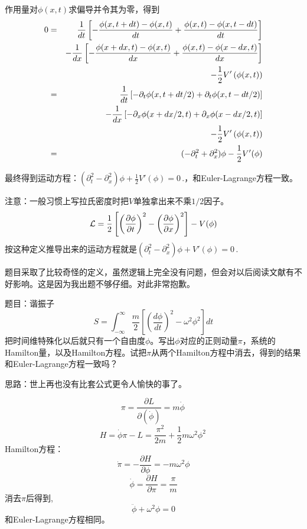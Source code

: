 \documentclass[CJK]{beamer}
\begin{document}
\begin{frame}
\bch
作用量对$\phi(x, t)$求偏导并令其为零，得到
\begin{eqnarray}
0 &=& \frac{1}{dt} \left [ -\frac{\phi(x, t+dt) - \phi(x,t)}{dt} + \frac{\phi(x, t) - \phi(x,t-dt)}{dt}\right]  \nonumber \\
  && -\frac{1}{dx}\left [- \frac{\phi(x+dx, t) - \phi(x,t)}{dx} + \frac{\phi(x, t) - \phi(x-dx,t)}{dx}\right] \nonumber \\
  && -\frac{1}{2}V'\left(\phi(x, t)\right) \nonumber \\ 
  &=& \frac{1}{dt}\left[-\partial_t\phi(x, t+dt/2) + \partial_t\phi(x, t-dt/2)\right] \nonumber \\
   &&- \frac{1}{dx}\left[-\partial_x\phi(x+dx/2, t) + \partial_x\phi(x-dx/2, t)\right] \nonumber \\
   &&-  \frac{1}{2} V'\left(\phi(x, t)\right)  \nonumber \\
  &=& (- \partial_t^2 + \partial_x^2 )\phi -\frac{1}{2} V'(\phi) \nonumber 
\end{eqnarray}
\ech
\end{frame}

\begin{frame}
\bch
最终得到运动方程：$(\partial_t^2 - \partial_x^2 )\phi + \frac{1}{2} V'(\phi) = 0 \,.$，和Euler-Lagrange方程一致。
\skipline

注意：一般习惯上写拉氏密度时把$V$单独拿出来不乘$1/2$因子。
$${\mathcal{L}} = \frac{1}{2} \left[\left(\frac{\partial \phi}{\partial t}\right)^2 - \left(\frac{\partial \phi}{\partial x}\right)^2\right] - V(\phi) $$
按这种定义推导出来的运动方程就是$(\partial_t^2 - \partial_x^2 )\phi + V'(\phi) = 0 \,.$

题目采取了比较奇怪的定义，虽然逻辑上完全没有问题，但会对以后阅读文献有不好影响。这是因为我出题不够仔细。对此非常抱歉。
\ech
\end{frame}


\begin{frame}
\bch
题目：谐振子
$$ S = \int_{-\infty}^\infty \frac{m}{2}\left[(\frac{d\phi}{dt})^2 - \omega^2\phi^2\right] dt$$
把时间维特殊化以后就只有一个自由度$\phi$。写出$\phi$对应的正则动量$\pi$，系统的Hamilton量，以及Hamilton方程。试把$\pi$从两个Hamilton方程中消去，得到的结果和Euler-Lagrange方程一致吗？

\skipline
思路：世上再也没有比套公式更令人愉快的事了。
\ech
\end{frame}

\begin{frame}
\bch
$$\pi = \frac{\partial L}{\partial (\dot\phi)} = m\dot\phi \, $$
$$ H = \dot\phi \pi - L = \frac{\pi^2}{2m} +  \frac{1}{2}m\omega^2\phi^2 \, $$
Hamilton方程：
$$\dot\pi = -\frac{\partial H}{\partial\phi} = - m\omega^2\phi$$  
$$\dot\phi = \frac{\partial H}{\partial \pi} = \frac{\pi}{m} $$
消去$\pi$后得到,
$$\ddot\phi + \omega^2\phi = 0$$
和Euler-Lagrange方程相同。
\ech
\end{frame}
\end{document}
